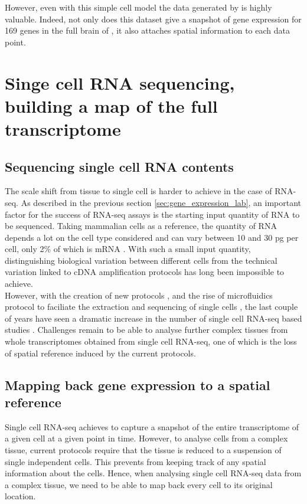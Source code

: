 	However, even with this simple cell model the data generated by \cite{Tomer10} is highly valuable. Indeed, not only does this dataset give a snapshot of gene expression for 169 genes in the full brain of \platy{}, it also attaches spatial information to each data point.\\

\section{Singe cell RNA sequencing, building a map of the full transcriptome}\label{sec:single_cell_rnaseq}
  \subsection{Sequencing single cell RNA contents}
	The scale shift from tissue to single cell is harder to achieve in the case of RNA-seq. As described in the previous section \ref{sec:gene_expression_lab}, an important factor for the success of RNA-seq assays is the starting input quantity of RNA to be sequenced. Taking mammalian cells as a reference, the quantity of RNA depends a lot on the cell type considered and can vary between 10 and 30 pg per cell, only 2\% of which is mRNA \cite{iscove02,islam11}. With such a small input quantity, distinguishing biological variation between different cells from the technical variation linked to cDNA amplification protocols has long been impossible to achieve.\\

	However, with the creation of new protocols \cite{ramskold12,tang09}, and the rise of microfluidics protocol to faciliate the extraction and sequencing of single cells \cite{ozsolak10}, the last couple of years have seen a dramatic increase in the number of single cell RNA-seq based studies \cite{islam13,marinov13,yan13,staahlberg13,deng14}. Challenges remain to be able to analyse further complex tissues from whole transcriptomes obtained from single cell RNA-seq, one of which is the loss of spatial reference induced by the current protocols.

  \subsection{Mapping back gene expression to a spatial reference}

	Single cell RNA-seq achieves to capture a snapshot of the entire transcriptome of a given cell at a given point in time. However, to analyse cells from a complex tissue, current protocols require that the tissue is reduced to a suspension of single independent cells. This prevents from keeping track of any spatial information about the cells. Hence, when analysing single cell RNA-seq data from a complex tissue, we need to be able to map back every cell to its original location.\\ 
	
